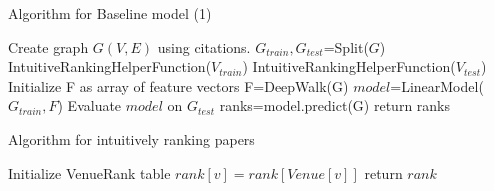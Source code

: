 \documentclass[a4paper, 11pt]{article}
\begin{document}

\begin{algorithm}
\caption{Algorithm for Baseline model (1)}
\label{alg:algo2}
\begin{algorithmic}[1]
\State Create graph $G(V,E)$ using citations.
\State $G_{train}, G_{test}$=Split($G$) 
\State IntuitiveRankingHelperFunction($V_{train}$)
\State IntuitiveRankingHelperFunction($V_{test}$)
\State Initialize F as array of feature vectors
\State F=DeepWalk(G) 
\State $model$=LinearModel($G_{train},F$)
\State Evaluate  $model$ on $G_{test}$
\State ranks=model.predict(G)
\State return ranks
\end{algorithmic}
\end{algorithm}
\begin{algorithm}
\caption{Algorithm for intuitively ranking papers}
\label{alg:algo3}
\begin{algorithmic}[1]
\State Initialize VenueRank table 
	\State $rank[v]=rank[Venue[v]]$ 
\EndFor
\State return $rank$
\EndProcedure
\end{algorithmic}
\end{algorithm}
\end{document}
